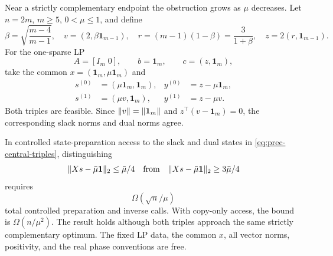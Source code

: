 Near a strictly complementary endpoint the obstruction grows as $\mu$
decreases.  Let
$n=2m$, $m\geq5$, $0<\mu\leq1$, and define
\begin{equation}
 \beta=\sqrt{\frac{m-4}{m-1}},\quad
 v=(2,\beta\mathbf1_{m-1}),\quad
 r=(m-1)(1-\beta)=\frac3{1+\beta},\quad
 z=2(r,\mathbf1_{m-1}).                                  \label{eq:prec-central-pair}
\end{equation}
For the one-sparse LP
\begin{equation}
 A=[I_m\;0],\qquad b=\mathbf1_m,\qquad c=(z,\mathbf1_m), \label{eq:prec-central-lp}
\end{equation}
take the common $x=(\mathbf1_m,\mu\mathbf1_m)$ and
\begin{align}
 s^{(0)}&=(\mu\mathbf1_m,\mathbf1_m),&
 y^{(0)}&=z-\mu\mathbf1_m,\nonumber\\
 s^{(1)}&=(\mu v,\mathbf1_m),&
 y^{(1)}&=z-\mu v.                                      \label{eq:prec-central-triples}
\end{align}
Both triples are feasible.  Since $\lVert v\rVert=\lVert\mathbf1_m\rVert$ and
$z^\top(v-\mathbf1_m)=0$, the corresponding slack norms and dual norms agree.

\begin{theorem}
\label{thm:prec-centrality-state}
In controlled state-preparation access to the slack and dual states in
\eqref{eq:prec-central-triples}, distinguishing
\begin{equation}
 \lVert Xs-\bar\mu\mathbf1\rVert_2\leq\bar\mu/4
 \quad\text{from}\quad
 \lVert Xs-\bar\mu\mathbf1\rVert_2\geq3\bar\mu/4              \label{eq:prec-centrality-promise}
\end{equation}
requires
\begin{equation}
 \boxed{\Omega(\sqrt n/\mu)}                             \label{eq:prec-centrality-lb}
\end{equation}
total controlled preparation and inverse calls.
With copy-only access, the bound is $\Omega(n/\mu^2)$.  The result
holds although both triples approach the same strictly complementary
optimum.  The fixed LP data, the common $x$, all vector norms, positivity,
and the real phase conventions are free.
\end{theorem}

